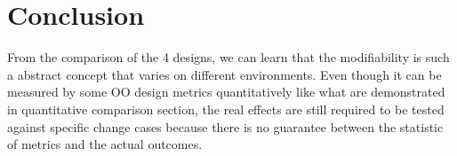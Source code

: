 \documentclass[conference]{IEEEtran}
\begin{document}
	
	
	
	
	
	
	
	\section{Conclusion}
	From the comparison of the 4 designs, we can learn that the modifiability is such a abstract concept that varies on different environments. Even though it can be measured by some \gls{OO} design metrics quantitatively like what are demonstrated in quantitative comparison section, the real effects are still required to be tested against specific change cases because there is no guarantee between the statistic of metrics and the actual outcomes.  
	
\end{document}
